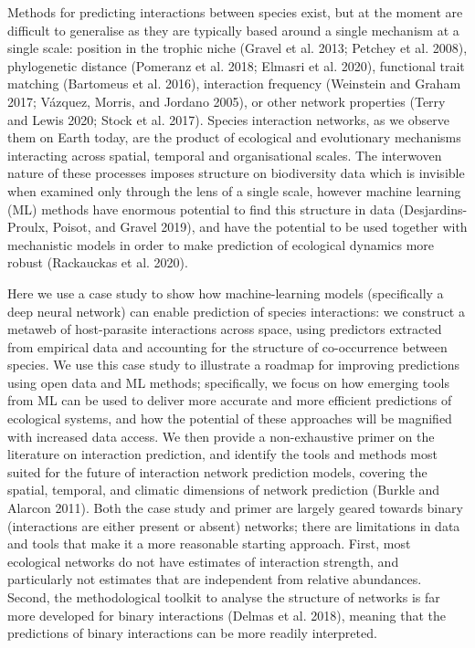\documentclass[10pt,oneside]{article}
\begin{document}
Methods for predicting interactions between species exist, but at the
moment are difficult to generalise as they are typically based around a
single mechanism at a single scale: position in the trophic niche
(Gravel et al. 2013; Petchey et al. 2008), phylogenetic distance
(Pomeranz et al. 2018; Elmasri et al. 2020), functional trait matching
(Bartomeus et al. 2016), interaction frequency (Weinstein and Graham
2017; Vázquez, Morris, and Jordano 2005), or other network properties
(Terry and Lewis 2020; Stock et al. 2017). Species interaction networks,
as we observe them on Earth today, are the product of ecological and
evolutionary mechanisms interacting across spatial, temporal and
organisational scales. The interwoven nature of these processes imposes
structure on biodiversity data which is invisible when examined only
through the lens of a single scale, however machine learning (ML)
methods have enormous potential to find this structure in data
(Desjardins-Proulx, Poisot, and Gravel 2019), and have the potential to
be used together with mechanistic models in order to make prediction of
ecological dynamics more robust (Rackauckas et al. 2020).

Here we use a case study to show how machine-learning models
(specifically a deep neural network) can enable prediction of species
interactions: we construct a metaweb of host-parasite interactions
across space, using predictors extracted from empirical data and
accounting for the structure of co-occurrence between species. We use
this case study to illustrate a roadmap for improving predictions using
open data and ML methods; specifically, we focus on how emerging tools
from ML can be used to deliver more accurate and more efficient
predictions of ecological systems, and how the potential of these
approaches will be magnified with increased data access. We then provide
a non-exhaustive primer on the literature on interaction prediction, and
identify the tools and methods most suited for the future of interaction
network prediction models, covering the spatial, temporal, and climatic
dimensions of network prediction (Burkle and Alarcon 2011). Both the
case study and primer are largely geared towards binary (interactions
are either present or absent) networks; there are limitations in data
and tools that make it a more reasonable starting approach. First, most
ecological networks do not have estimates of interaction strength, and
particularly not estimates that are independent from relative
abundances. Second, the methodological toolkit to analyse the structure
of networks is far more developed for binary interactions (Delmas et al.
2018), meaning that the predictions of binary interactions can be more
readily interpreted.
\end{document}
